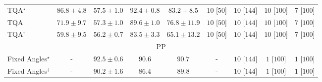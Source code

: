 \begin{tabular}{l|cccc|cccc|}
TQA$^\star$ & {\cellcolor[HTML]{C64902}} \color[HTML]{F1F1F1} $86.8\pm 4.8$ & {\cellcolor[HTML]{FFF8C0}} \color[HTML]{000000} $57.5\pm 1.0$ & {\cellcolor[HTML]{933204}} \color[HTML]{F1F1F1} $92.4\pm 0.8$ & {\cellcolor[HTML]{DC5E0B}} \color[HTML]{F1F1F1} $83.2\pm 8.5$ & {\cellcolor[HTML]{FFF6F2}} \color[HTML]{000000} $10$ [$50$] & {\cellcolor[HTML]{FFF6F2}} \color[HTML]{000000} $10$ [$144$] & {\cellcolor[HTML]{FFF6F2}} \color[HTML]{000000} $10$ [$100$] & {\cellcolor[HTML]{FFF6F2}} \color[HTML]{000000} $7$ [$100$] \\
TQA & {\cellcolor[HTML]{FEAF3D}} \color[HTML]{000000} $71.9\pm 9.7$ & {\cellcolor[HTML]{FFF8C1}} \color[HTML]{000000} $57.3\pm 1.0$ & {\cellcolor[HTML]{AC3D03}} \color[HTML]{F1F1F1} $89.6\pm 1.0$ & {\cellcolor[HTML]{F88A21}} \color[HTML]{F1F1F1} $76.8\pm 11.9$ & {\cellcolor[HTML]{FFF6F2}} \color[HTML]{000000} $10$ [$50$] & {\cellcolor[HTML]{FFF6F2}} \color[HTML]{000000} $10$ [$144$] & {\cellcolor[HTML]{FFF6F2}} \color[HTML]{000000} $10$ [$100$] & {\cellcolor[HTML]{FFF6F2}} \color[HTML]{000000} $7$ [$100$] \\
TQA$^\dagger$ & {\cellcolor[HTML]{FFF1AE}} \color[HTML]{000000} $59.8\pm 9.5$ & {\cellcolor[HTML]{FFF9C9}} \color[HTML]{000000} $56.2\pm 0.7$ & {\cellcolor[HTML]{DA5C0A}} \color[HTML]{F1F1F1} $83.5\pm 3.3$ & {\cellcolor[HTML]{FEDB80}} \color[HTML]{000000} $65.1\pm 13.2$ & {\cellcolor[HTML]{FFF6F2}} \color[HTML]{000000} $10$ [$50$] & {\cellcolor[HTML]{FFF6F2}} \color[HTML]{000000} $10$ [$144$] & {\cellcolor[HTML]{FFF6F2}} \color[HTML]{000000} $10$ [$100$] & {\cellcolor[HTML]{FFF6F2}} \color[HTML]{000000} $7$ [$100$] \\
\cline{1-9}
\multicolumn{9}{c}{\rule{0pt}{8pt}PP} \\
\midrule
Fixed Angles$^\star$ & {\cellcolor[HTML]{000000}} \color[HTML]{F1F1F1} {\cellcolor{white}} \color{black} - & {\cellcolor[HTML]{006335}} \color[HTML]{F1F1F1} $92.5\pm 0.6$ & {\cellcolor[HTML]{076D39}} \color[HTML]{F1F1F1} $90.6$ & {\cellcolor[HTML]{076D39}} \color[HTML]{F1F1F1} $90.7$ & {\cellcolor[HTML]{000000}} \color[HTML]{F1F1F1} {\cellcolor{white}} \color{black} - & {\cellcolor[HTML]{FFF6F2}} \color[HTML]{000000} $10$ [$144$] & {\cellcolor[HTML]{FFF7F3}} \color[HTML]{000000} $1$ [$100$] & {\cellcolor[HTML]{FFF7F3}} \color[HTML]{000000} $1$ [$100$] \\
Fixed Angles$^\dagger$ & {\cellcolor[HTML]{000000}} \color[HTML]{F1F1F1} {\cellcolor{white}} \color{black} - & {\cellcolor[HTML]{096F3A}} \color[HTML]{F1F1F1} $90.2\pm 1.6$ & {\cellcolor[HTML]{218242}} \color[HTML]{F1F1F1} $86.4$ & {\cellcolor[HTML]{0C723B}} \color[HTML]{F1F1F1} $89.8$ & {\cellcolor[HTML]{000000}} \color[HTML]{F1F1F1} {\cellcolor{white}} \color{black} - & {\cellcolor[HTML]{FFF6F2}} \color[HTML]{000000} $10$ [$144$] & {\cellcolor[HTML]{FFF7F3}} \color[HTML]{000000} $1$ [$100$] & {\cellcolor[HTML]{FFF7F3}} \color[HTML]{000000} $1$ [$100$] \\

\end{tabular}
